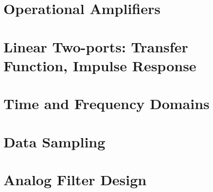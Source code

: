 \chapter{Operational Amplifiers}



\chapter{Linear Two-ports: Transfer Function, Impulse Response}


\chapter{Time and Frequency Domains}


\chapter{Data Sampling}


\chapter{Analog Filter Design}